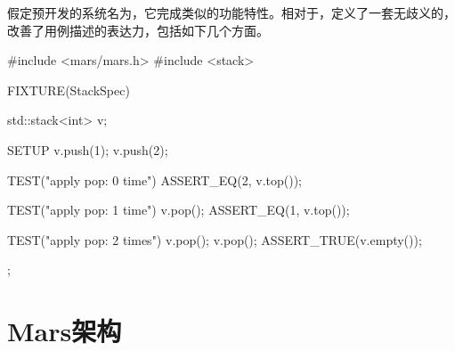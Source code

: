 \begin{content}
假定预开发的系统名为，它完成类似的功能特性。相对于，定义了一套无歧义的，改善了用例描述的表达力，包括如下几个方面。

\begin{enum}
\end{enum}

\begin{leftbar}
 \begin{c++}
#include <mars/mars.h>
#include <stack>

FIXTURE(StackSpec) {
  std::stack<int> v;   

  SETUP {
    v.push(1);
    v.push(2);
  }

  TEST("apply pop: 0 time") {
    ASSERT_EQ(2, v.top());
  }

  TEST("apply pop: 1 time") {
    v.pop();
    ASSERT_EQ(1, v.top());
  }

  TEST("apply pop: 2 times") {
    v.pop();
    v.pop();
    ASSERT_TRUE(v.empty());
  }
}; 
 \end{c++}
\end{leftbar}

\end{content}

\section{Mars架构}
	
